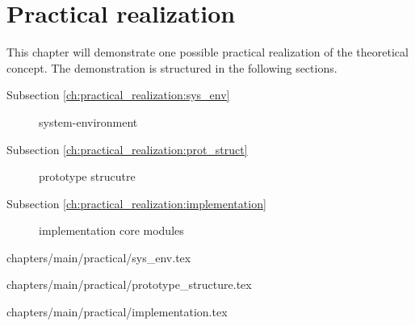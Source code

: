 \chapter{Practical realization}
\label{ch:practical_realization}
This chapter will demonstrate one possible practical realization of the theoretical concept. The demonstration is structured in the following sections.
\begin{description}
\item [Subsection \ref{ch:practical_realization:sys_env}] system-environment 
\item [Subsection \ref{ch:practical_realization:prot_struct}] prototype strucutre
\item [Subsection \ref{ch:practical_realization:implementation}] implementation core modules
\end{description}

 {chapters/main/practical/sys_env.tex}		

 {chapters/main/practical/prototype_structure.tex}

 {chapters/main/practical/implementation.tex}
